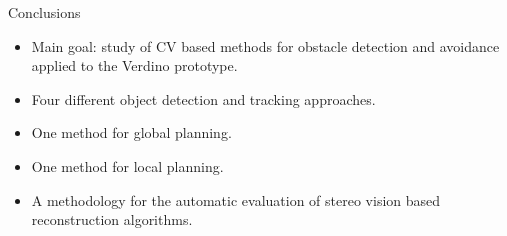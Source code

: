 \graphicspath{{./images/bmps/}{./images/vects/}{./images/}
	      {./images/presentation/bmps/}{./images/presentation/vects/}{./images/presentation/}
	      {./images/chapter00/bmps/}{./images/chapter00/vects/}{./images/chapter00/}
	      {./images/chapter04/bmps/}{./images/chapter04/vects/}{./images/chapter04/}
	      }

\begin{frame}{Conclusions}
  \begin{itemize}
   \item Main goal: study of CV based methods for obstacle detection and avoidance applied to the Verdino prototype. 
   \item Four different object detection and tracking approaches.
   \item One method for global planning.
   \item One method for local planning.
   \item A methodology for the automatic evaluation of stereo vision based reconstruction algorithms.
  \end{itemize}
\end{frame}


